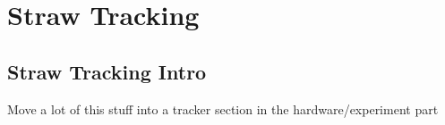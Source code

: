 \chapter{Straw Tracking}
\label{chapter:Straw Tracking}
\thispagestyle{myheadings} %


\graphicspath{ {Body/Figures/TrackingFigures/} {Body/Figures/TrackingFigures/MainPlots/} {Body/Figures/TrackingFigures/MainPlots/PlanePlots/} {Body/Figures/TrackingFigures/MainPlots/PullPlots/} {Body/Figures/TrackingFigures/MainPlots/Residuals/} {Body/Figures/TrackingFigures/eLoss/} {Body/Figures/TrackingFigures/CoordSys/} {Body/Figures/TrackingFigures/TrackerPics/} {Body/Figures/TrackingFigures/Field/} {Body/Figures/TrackingFigures/TrackingFlow/} {Body/Figures/TrackingFigures/LeftRight/} {Body/Figures/TrackingFigures/Misc/}}

\section{Straw Tracking Intro}
\label{sec:StrawTrackingIntro}


Move a lot of this stuff into a tracker section in the hardware/experiment part


